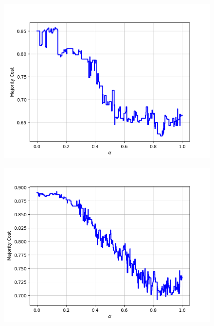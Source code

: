 \begin{figure}[H]
\begin{minipage}{.24\textwidth}
  {\includegraphics[width=\linewidth]{plots/omniglot-intra-ac/Cyrillic}}
\end{minipage}
\begin{minipage}{.24\textwidth}
  \centering
  {\includegraphics[width=\linewidth]{plots/omniglot-intra-ac/Early_Aramaic}}
\end{minipage}
\begin{minipage}{.24\textwidth}
  \centering

\end{minipage}
\end{figure}

